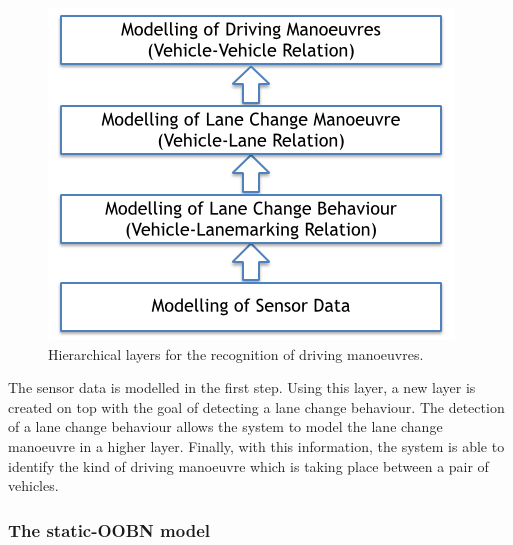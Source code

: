 \begin{figure}
\begin{center}
\includegraphics[scale=0.58]{./figures/DaimlerHierarchicalModelling}
\caption{\label{Figure:DaimlerHierarchicalModelling} Hierarchical layers for the recognition of driving manoeuvres.}
\end{center}
\end{figure}

The sensor data is modelled in the first step. Using this layer, a new layer is created on top with the goal of detecting a lane change behaviour. The detection of a lane change behaviour allows the system to model the lane change manoeuvre in a higher layer. Finally, with this information, the system is able to identify the kind of driving manoeuvre which is taking place between a pair of vehicles. 



\subsubsection*{The static-OOBN model}


